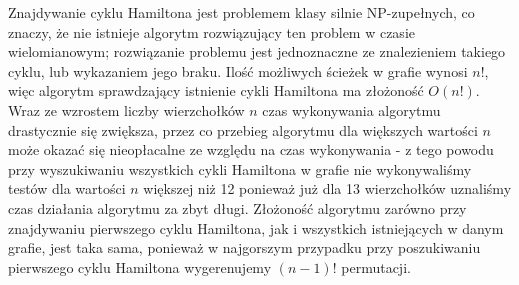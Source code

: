 \documentclass{article}
\begin{document}
Znajdywanie cyklu Hamiltona jest problemem klasy silnie NP-zupełnych, co znaczy, że nie istnieje algorytm rozwiązujący ten problem w czasie wielomianowym; rozwiązanie problemu jest jednoznaczne ze znalezieniem takiego cyklu, lub wykazaniem jego braku. Ilość możliwych ścieżek w grafie wynosi $n!$, więc algorytm sprawdzający istnienie cykli Hamiltona ma złożoność $O(n!)$. Wraz ze wzrostem liczby wierzchołków $n$ czas wykonywania algorytmu drastycznie się zwiększa, przez co przebieg algorytmu dla większych wartości $n$ może okazać się nieopłacalne ze względu na czas wykonywania - z tego powodu przy wyszukiwaniu wszystkich cykli Hamiltona w grafie nie wykonywaliśmy testów dla wartości $n$ większej niż 12 ponieważ już dla 13 wierzchołków uznaliśmy czas działania algorytmu za zbyt długi. Złożoność algorytmu zarówno przy znajdywaniu pierwszego cyklu Hamiltona, jak i wszystkich istniejących w danym grafie, jest taka sama, ponieważ w najgorszym przypadku przy poszukiwaniu pierwszego cyklu Hamiltona wygerenujemy $(n-1)!$ permutacji.
\end{document}
